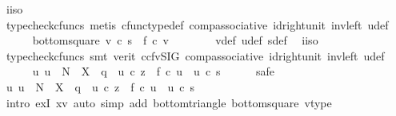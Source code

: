 \begin{isabellebody}
\ i{\isacharunderscore}{\kern0pt}iso\isanewline
\ \ \ \ \ \ \isamarkupfalse%
\ {\isacharparenleft}{\kern0pt}typecheck{\isacharunderscore}{\kern0pt}cfuncs{\isacharcomma}{\kern0pt}\ metis\ cfunc{\isacharunderscore}{\kern0pt}type{\isacharunderscore}{\kern0pt}def\ comp{\isacharunderscore}{\kern0pt}associative\ id{\isacharunderscore}{\kern0pt}right{\isacharunderscore}{\kern0pt}unit{}\ inv{\isacharunderscore}{\kern0pt}left\ u{\isacharunderscore}{\kern0pt}def{\isacharparenright}{\kern0pt}\isanewline
\ \ \ \ \isamarkupfalse%
\ bottom{\isacharunderscore}{\kern0pt}square{\isacharcolon}{\kern0pt}\ {\isachardoublequoteopen}v\ {\isasymcirc}\isactrlsub c\ s\ {\isacharequal}{\kern0pt}\ f\ {\isasymcirc}\isactrlsub c\ v{\isachardoublequoteclose}\isanewline
\ \ \ \ \ \ \isamarkupfalse%
\ v{\isacharunderscore}{\kern0pt}def\ u{\isacharunderscore}{\kern0pt}def\ s{\isacharunderscore}{\kern0pt}def\ \isamarkupfalse%
\ i{\isacharunderscore}{\kern0pt}iso\isanewline
\ \ \ \ \ \ \isamarkupfalse%
\ {\isacharparenleft}{\kern0pt}typecheck{\isacharunderscore}{\kern0pt}cfuncs{\isacharcomma}{\kern0pt}\ smt\ {\isacharparenleft}{\kern0pt}verit{\isacharcomma}{\kern0pt}\ ccfv{\isacharunderscore}{\kern0pt}SIG{\isacharparenright}{\kern0pt}\ comp{\isacharunderscore}{\kern0pt}associative{}\ id{\isacharunderscore}{\kern0pt}right{\isacharunderscore}{\kern0pt}unit{}\ inv{\isacharunderscore}{\kern0pt}left\ u{\isacharunderscore}{\kern0pt}def{\isacharparenright}{\kern0pt}\isanewline
\ \ \ \ \isamarkupfalse%
\ {\isachardoublequoteopen}{\isasymexists}{\isacharbang}{\kern0pt}u{\isachardot}{\kern0pt}\ u\ {\isacharcolon}{\kern0pt}\ N\ {\isasymrightarrow}\ X\ {\isasymand}\ q\ {\isacharequal}{\kern0pt}\ u\ {\isasymcirc}\isactrlsub c\ z\ {\isasymand}\ f\ {\isasymcirc}\isactrlsub c\ u\ {\isacharequal}{\kern0pt}\ u\ {\isasymcirc}\isactrlsub c\ s{\isachardoublequoteclose}\isanewline
\ \ \ \ \isamarkupfalse%
\ safe\isanewline
\ \ \ \ \ \ \isamarkupfalse%
\ {\isachardoublequoteopen}{\isasymexists}u{\isachardot}{\kern0pt}\ u\ {\isacharcolon}{\kern0pt}\ N\ {\isasymrightarrow}\ X\ {\isasymand}\ q\ {\isacharequal}{\kern0pt}\ u\ {\isasymcirc}\isactrlsub c\ z\ {\isasymand}\ f\ {\isasymcirc}\isactrlsub c\ u\ {\isacharequal}{\kern0pt}\ u\ {\isasymcirc}\isactrlsub c\ s{\isachardoublequoteclose}\isanewline
\ \ \ \ \ \ \ \ \isamarkupfalse%
\ {\isacharparenleft}{\kern0pt}intro\ exI{\isacharbrackleft}{\kern0pt}\ x{\isacharequal}{\kern0pt}v{\isacharbrackright}{\kern0pt}{\isacharcomma}{\kern0pt}\ auto\ simp\ add{\isacharcolon}{\kern0pt}\ bottom{\isacharunderscore}{\kern0pt}triangle\ bottom{\isacharunderscore}{\kern0pt}square\ v{\isacharunderscore}{\kern0pt}type{\isacharparenright}{\kern0pt}\isanewline

\end{isabellebody}
